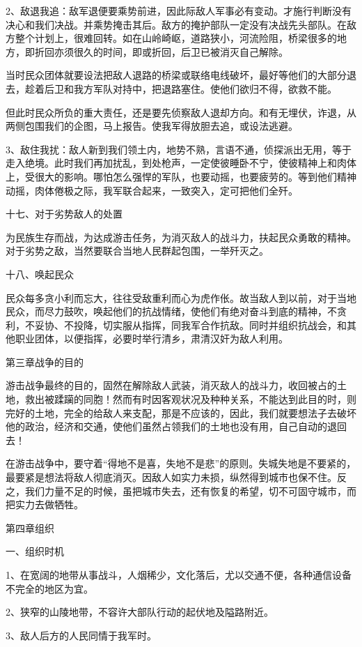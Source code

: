 2、敌退我追：敌军退便要乘势前进，因此际敌人军事必有变动。才施行判断没有决心和我们决战。并乘势掩击其后。敌方的掩护部队一定没有决战先头部队。在敌方整个计划上，很难回转。如在山岭崎岖，道路狭小，河流险阻，桥梁很多的地方，即折回亦须很久的时间，即或折回，后卫已被消灭自己解除。

当时民众团体就要设法把敌人退路的桥梁或联络电线破坏，最好等他们的大部分退去，趁着后卫和我方军队对持中，把退路塞住。使他们欲归不得，欲救不能。

但此时民众所负的重大责任，还是要先侦察敌人退却方向。和有无埋伏，诈退，从两侧包围我们的企图，马上报告。使我军得放胆去追，或设法逃避。

3、敌住我扰：敌人新到我们领土内，地势不熟，言语不通，侦探派出无用，等于走入绝境。此时我们再加扰乱，到处枪声，一定使彼睡卧不宁，使彼精神上和肉体上，受很大的影响。哪怕怎么强悍的军队，也要动摇，也要疲劳的。等到他们精神动摇，肉体倦极之际，我军联合起来，一致突入，定可把他们全歼。

十七、对于劣势敌人的处置

为民族生存而战，为达成游击任务，为消灭敌人的战斗力，扶起民众勇敢的精神。对于劣势之敌，当然要联合当地人民群起包围，一举歼灭之。

十八、唤起民众

民众每多贪小利而忘大，往往受敌重利而心为虎作伥。故当敌人到以前，对于当地民众，而尽力鼓吹，唤起他们的抗战情绪，使他们有绝对奋斗到底的精神，不贪利，不妥协、不投降，切实服从指挥，同我军合作抗敌。同时并组织抗战会，和其他职业团体，以便指挥，必要时举行清乡，肃清汉奸为敌人利用。

第三章战争的目的

游击战争最终的目的，固然在解除敌人武装，消灭敌人的战斗力，收回被占的土地，救出被蹂躏的同胞！然而有时因客观状况及种种关系，不能达到此目的时，则完好的土地，完全的给敌人来支配，那是不应该的，因此，我们就要想法子去破坏他的政治，经济和交通，使他们虽然占领我们的土地也没有用，自己自动的退回去！

在游击战争中，要守着“得地不是喜，失地不是悲”的原则。失城失地是不要紧的，最要紧是想法将敌人彻底消灭。因敌人如实力未损，纵然得到城市也保不住。反之，我们力量不足的时候，虽把城市失去，还有恢复的希望，切不可固守城市，而把实力去做牺牲。

第四章组织

一、组织时机

1、在宽阔的地带从事战斗，人烟稀少，文化落后，尤以交通不便，各种通信设备不完全的地区为宜。

2、狭窄的山陵地带，不容许大部队行动的起伏地及隘路附近。

3、敌人后方的人民同情于我军时。

